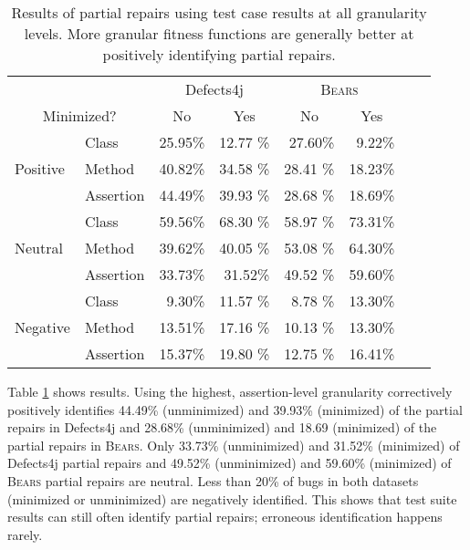 \documentclass[10pt, conference]{IEEEtran}
\newcommand\bears{\textsc{Bears}\xspace}
\begin{document}
\begin{table}
{\begin{center}
\begin{tabular}{ll|rr|rrrr}
\toprule
\multicolumn{2}{c}{}&\multicolumn{2}{c}{Defects4j} & \multicolumn{2}{c}{\bears} \\
\multicolumn{2}{c}{Minimized?} & \multicolumn{1}{c}{No} & \multicolumn{1}{c}{Yes} & \multicolumn{1}{c}{No} & \multicolumn{1}{c}{Yes}  \\
\midrule
\multirow{3}{*}{Positive} & Class & 25.95\% & 12.77 \% & 27.60\% & 9.22\%  \\
 & Method & 40.82\% & 34.58 \% & 28.41 \% & 18.23\%  \\
 & Assertion & 44.49\% & 39.93 \% & 28.68 \% & 18.69\%  \\ 
\midrule
\multirow{3}{*}{Neutral} & Class & 59.56\% & 68.30 \% & 58.97 \% & 73.31\% \\
 & Method & 39.62\% & 40.05 \% & 53.08 \% & 64.30\%  \\
 & Assertion & 33.73\% & 31.52\% & 49.52 \% &  59.60\%  \\ 
\midrule
\multirow{3}{*}{Negative} & Class & 9.30\% & 11.57 \% & 8.78 \% & 13.30\%  \\
 & Method & 13.51\% & 17.16 \% & 10.13 \% & 13.30\%  \\
 & Assertion & 15.37\% & 19.80 \% & 12.75 \% &  16.41\%  \\ 
\bottomrule
\end{tabular}
\end{center}}
\caption{Results of partial repairs using test case results
at all granularity levels.
More granular fitness functions are generally better at positively identifying partial repairs.}
\label{yiweitable}
\end{table}

Table \ref{yiweitable} shows results.
%
Using the highest, assertion-level granularity correctively positively identifies 44.49\% (unminimized) and 39.93\% (minimized) of the partial repairs in Defects4j
and 28.68\% (unminimized) and 18.69 (minimized) of the partial repairs in \bears.
Only 33.73\% (unminimized) and 31.52\% (minimized) of Defects4j partial repairs and 
49.52\% (unminimized) and 59.60\% (minimized)
of \bears partial repairs are neutral. Less than 20\% of bugs in both datasets 
(minimized or unminimized) are negatively identified. This shows that
test suite results can still often identify
partial repairs; erroneous identification happens rarely. 
 
\end{document}
